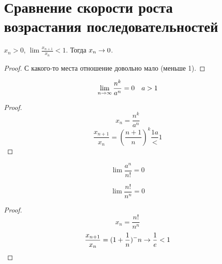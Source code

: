 ﻿\section{Сравнение скорости роста возрастания последовательностей}

\begin{theorem}{}
$x_n > 0$, $\lim \frac{x_{n+1}}{x_n} < 1$. Тогда $x_n \rightarrow 0$.
\end{theorem}
\begin{proof}
С какого-то места отношение довольно мало (меньше 1).
\end{proof}
\begin{conseq}
$$\lim_{n\rightarrow\infty} \frac{n^k}{a^n} = 0\quad a>1$$
\end{conseq}
\begin{proof}
$$x_n = \frac{n^k}{a^n}$$
$$\frac{x_{n+1}}{x_n} = \left(\frac{n+1}n\right)^k \frac{1a} < 1$$
\end{proof}
\begin{conseq}
$$\lim \frac{a^n}{n!} = 0$$
\end{conseq}

\begin{conseq}
$$\lim \frac{n!}{n^n} = 0$$
\end{conseq}
\begin{proof}
$$x_n = \frac{n!}{n^n}$$
$$\frac{x_{n+1}}{x_n} = (1+\frac1n)^-n \rightarrow \frac1e < 1$$
\end{proof}

